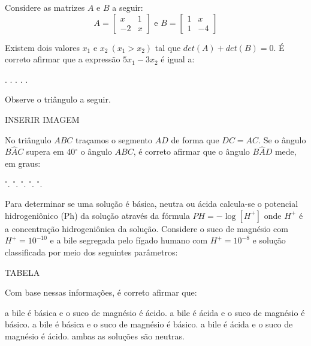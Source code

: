 \begin{question}%
Considere as matrizes \(A\) e \(B\) a seguir:
\[ A = \begin{bmatrix}
        x & 1 \\
        -2 & x 
    \end{bmatrix}
\textrm{ e } 
   B = \begin{bmatrix}
        1 & x \\
        1 & -4 
    \end{bmatrix}
 \]

Existem dois valores \(x_1\) e \( x_2 ~ (x_1 > x_2)\) tal que \(det(A) + det(B) = 0\). É correto afirmar que a expressão \(5x_1 - 3x_2\) é igual a:
    \begin{tasks}
        .
        .
        .
        .
        .
    \end{tasks}
\end{question}

\begin{question}%
Observe o triângulo a seguir.

INSERIR IMAGEM

No triângulo \(ABC\) traçamos o segmento \(AD\) de forma que \(DC=AC\). Se o ângulo \(B\hat{A}C\) supera em 40\(^\circ\) o ângulo \(ABC\), é correto afirmar que o ângulo \(B\hat{A}D\) mede, em graus:
    \begin{tasks}
        \(^\circ\).
        \(^\circ\).
        \(^\circ\).
        \(^\circ\).
        \(^\circ\).
    \end{tasks}
\end{question}

\begin{question}%
Para determinar se uma solução é básica, neutra ou ácida calcula-se o potencial hidrogeniônico (Ph) da solução através da fórmula \(PH = -\log [H^{+}]\) onde \(H^{+}\) é a concentração hidrogeniônica da solução. Considere o suco de magnésio com \(H^{+} = 10^{-10}\) e a bile segregada pelo fígado humano com \(H^{+} = 10^{-8}\) e solução classificada por meio dos seguintes parâmetros:

TABELA

Com base nessas informações, é correto afirmar que:
    \begin{tasks}
        \task a bile é básica e o suco de magnésio é ácido.
        \task a bile é ácida e o suco de magnésio é básico.
        \task a bile é básica e o suco de magnésio é básico.
        \task a bile é ácida e o suco de magnésio é ácido.
        \task ambas as soluções são neutras.
    \end{tasks}
\end{question}

